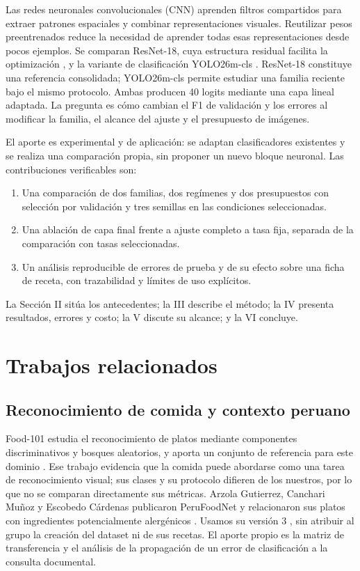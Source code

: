 \documentclass[conference]{IEEEtran}
\begin{document}
Las redes neuronales convolucionales (CNN) aprenden filtros compartidos para extraer patrones espaciales y combinar representaciones visuales. Reutilizar pesos preentrenados reduce la necesidad de aprender todas esas representaciones desde pocos ejemplos. Se comparan ResNet-18, cuya estructura residual facilita la optimización \cite{he2016}, y la variante de clasificación YOLO26m-cls \cite{jocher2026}. ResNet-18 constituye una referencia consolidada; YOLO26m-cls permite estudiar una familia reciente bajo el mismo protocolo. Ambas producen 40 logits mediante una capa lineal adaptada. La pregunta es cómo cambian el F1 de validación y los errores al modificar la familia, el alcance del ajuste y el presupuesto de imágenes.

El aporte es experimental y de aplicación: se adaptan clasificadores existentes y se realiza una comparación propia, sin proponer un nuevo bloque neuronal. Las contribuciones verificables son:
\begin{enumerate}
\item Una comparación de dos familias, dos regímenes y dos presupuestos con selección por validación y tres semillas en las condiciones seleccionadas.
\item Una ablación de capa final frente a ajuste completo a tasa fija, separada de la comparación con tasas seleccionadas.
\item Un análisis reproducible de errores de prueba y de su efecto sobre una ficha de receta, con trazabilidad y límites de uso explícitos.
\end{enumerate}
La Sección II sitúa los antecedentes; la III describe el método; la IV presenta resultados, errores y costo; la V discute su alcance; y la VI concluye.

\section{Trabajos relacionados}
\subsection{Reconocimiento de comida y contexto peruano}
Food-101 estudia el reconocimiento de platos mediante componentes discriminativos y bosques aleatorios, y aporta un conjunto de referencia para este dominio \cite{bossard2014}. Ese trabajo evidencia que la comida puede abordarse como una tarea de reconocimiento visual; sus clases y su protocolo difieren de los nuestros, por lo que no se comparan directamente sus métricas. Arzola Gutierrez, Canchari Muñoz y Escobedo Cárdenas publicaron PeruFoodNet y relacionaron sus platos con ingredientes potencialmente alergénicos \cite{arzola2025}. Usamos su versión 3 \cite{perufoodnetv3}, sin atribuir al grupo la creación del dataset ni de sus recetas. El aporte propio es la matriz de transferencia y el análisis de la propagación de un error de clasificación a la consulta documental.
\end{document}
